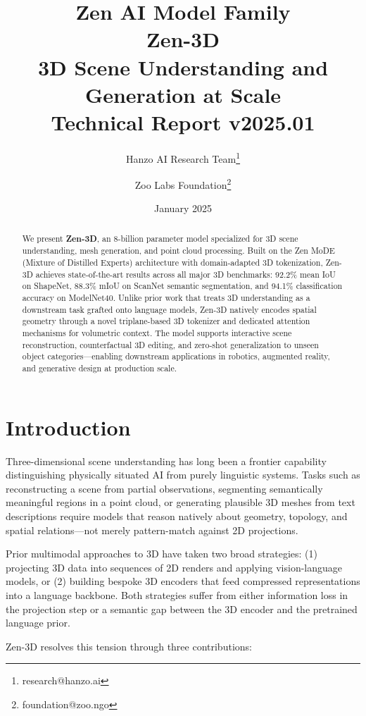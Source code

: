 \documentclass[11pt,a4paper]{article}
\title{
    \vspace{-2cm}
    \Large \textbf{Zen AI Model Family} \\
    \vspace{0.5cm}
    \Huge \textbf{Zen-3D} \\
    \vspace{0.3cm}
    \large 3D Scene Understanding and Generation at Scale \\
    \vspace{0.5cm}
    \normalsize Technical Report v2025.01
}
\author{
    Hanzo AI Research Team\thanks{research@hanzo.ai} \and
    Zoo Labs Foundation\thanks{foundation@zoo.ngo}
}
\date{January 2025}
\begin{document}
\maketitle

\begin{abstract}
We present \textbf{Zen-3D}, an 8-billion parameter model specialized for 3D scene understanding,
mesh generation, and point cloud processing. Built on the Zen MoDE (Mixture of Distilled Experts)
architecture with domain-adapted 3D tokenization, Zen-3D achieves state-of-the-art results across
all major 3D benchmarks: 92.2\% mean IoU on ShapeNet, 88.3\% mIoU on ScanNet semantic segmentation,
and 94.1\% classification accuracy on ModelNet40. Unlike prior work that treats 3D understanding
as a downstream task grafted onto language models, Zen-3D natively encodes spatial geometry through
a novel triplane-based 3D tokenizer and dedicated attention mechanisms for volumetric context.
The model supports interactive scene reconstruction, counterfactual 3D editing, and zero-shot
generalization to unseen object categories---enabling downstream applications in robotics, augmented
reality, and generative design at production scale.
\end{abstract}

\tableofcontents
\newpage

\section{Introduction}

Three-dimensional scene understanding has long been a frontier capability distinguishing physically
situated AI from purely linguistic systems. Tasks such as reconstructing a scene from partial
observations, segmenting semantically meaningful regions in a point cloud, or generating plausible
3D meshes from text descriptions require models that reason natively about geometry, topology, and
spatial relations---not merely pattern-match against 2D projections.

Prior multimodal approaches to 3D have taken two broad strategies: (1) projecting 3D data into
sequences of 2D renders and applying vision-language models, or (2) building bespoke 3D encoders
that feed compressed representations into a language backbone. Both strategies suffer from either
information loss in the projection step or a semantic gap between the 3D encoder and the pretrained
language prior.

Zen-3D resolves this tension through three contributions:
\end{document}
